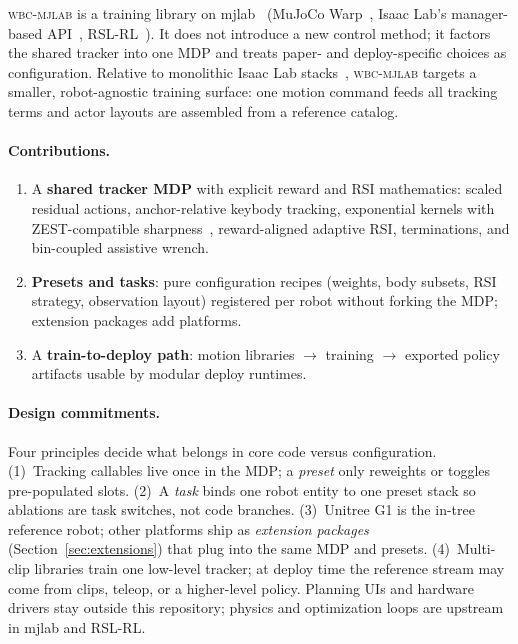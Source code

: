 \documentclass[11pt,a4paper]{article}
\begin{document}
\textsc{wbc-mjlab} is a training library on mjlab~\citep{zakka2026mjlab}
(MuJoCo Warp~\citep{mujoco_warp2025}, Isaac Lab's manager-based
API~\citep{mittal2025isaaclab}, RSL-RL~\citep{schwarke2025rslrl}). It does not
introduce a new control method; it factors the shared tracker into one MDP and
treats paper- and deploy-specific choices as configuration. Relative to monolithic
Isaac Lab stacks~\citep{hybridrobotics_wbt,nvlabs_groot_wbc2026},
\textsc{wbc-mjlab} targets a smaller, robot-agnostic training surface: one
motion command feeds all tracking terms and actor layouts are assembled from a
reference catalog.

\paragraph{Contributions.}
\begin{enumerate}[leftmargin=1.4em,itemsep=0.25em]
  \item A \textbf{shared tracker MDP} with explicit reward and RSI mathematics:
        scaled residual actions, anchor-relative keybody tracking, exponential
        kernels with ZEST-compatible sharpness~\citep{zest2026}, reward-aligned
        adaptive RSI, terminations, and bin-coupled assistive wrench.
  \item \textbf{Presets and tasks}: pure configuration recipes (weights, body
        subsets, RSI strategy, observation layout) registered per robot without
        forking the MDP; extension packages add platforms.
  \item A \textbf{train-to-deploy path}: motion libraries $\to$ training
        $\to$ exported policy artifacts usable by modular deploy runtimes.
\end{enumerate}

\paragraph{Design commitments.}
Four principles decide what belongs in core code versus configuration.
(1)~Tracking callables live once in the MDP; a \emph{preset} only reweights or
toggles pre-populated slots.
(2)~A \emph{task} binds one robot entity to one preset stack so ablations are
task switches, not code branches.
(3)~Unitree G1 is the in-tree reference robot; other platforms ship as
\emph{extension packages} (Section~\ref{sec:extensions}) that plug into the
same MDP and presets.
(4)~Multi-clip libraries train one low-level tracker; at deploy time the
reference stream may come from clips, teleop, or a higher-level policy.
Planning UIs and hardware drivers stay outside this repository; physics and
optimization loops are upstream in mjlab and RSL-RL.
\end{document}

